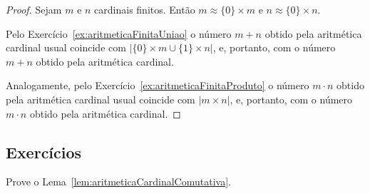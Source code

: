 \begin{proof}
    Sejam $m$ e $n$ cardinais finitos.
    Então $m\approx \{0\}\times m$ e $n\approx \{0\}\times n$.

    Pelo Exercício~\ref{ex:aritmeticaFinitaUniao} o número $m+n$ obtido pela aritmética cardinal usual coincide com $|\{0\}\times m \cup \{1\}\times n|$, e, portanto, com o número $m+n$ obtido pela aritmética cardinal.

    Analogamente, pelo Exercício~\ref{ex:aritmeticaFinitaProduto} o número $m\cdot n$ obtido pela aritmética cardinal usual coincide com $|m\times n|$, e, portanto, com o número $m\cdot n$ obtido pela aritmética cardinal.
\end{proof}

\subsection*{Exercícios}
\begin{exercise}Prove o Lema~\ref{lem:aritmeticaCardinalComutativa}.
\end{exercise}

